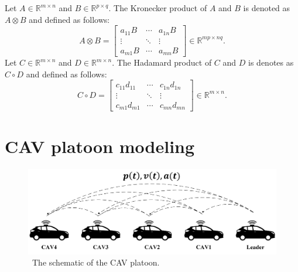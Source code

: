 \documentclass[a4paper]{cas-sc}
\begin{document}
\begin{itemize}
Let $A \in {\mathbb{R}^{m \times n}}$ and $B \in {\mathbb{R}^{p \times q}}$. The Kronecker product of $A$ and $B$ is denoted as $A \otimes B$ and defined as follows:
\begin{equation*}
A \otimes B = \left[ {\begin{array}{*{20}{c}}
  {{a_{11}}B} & \cdots & {{a_{1n}}B} \\
  \vdots      & \ddots & \vdots      \\
  {{a_{m1}}B} & \cdots & {{a_{mn}}B}
\end{array}} \right] \in {\mathbb{R}^{mp \times nq}}.
\end{equation*}
Let $C \in {\mathbb{R}^{m \times n}}$ and $D \in {\mathbb{R}^{m \times n}}$. The Hadamard product of $C$ and $D$ is denotes as $C \circ D$ and defined as follows:
\begin{equation*}
C \circ D = \left[ {\begin{array}{*{20}{c}}
  {{c_{11}}{d_{11}}} & \cdots & {{c_{1n}}{d_{1n}}} \\
  \vdots             & \ddots & \vdots             \\
  {{c_{m1}}{d_{m1}}} & \cdots & {{c_{mn}}{d_{mn}}}
\end{array}} \right] \in {\mathbb{R}^{m \times n}}.
\end{equation*}
\end{itemize}





\section{CAV platoon modeling}
\label{Section 3}

\begin{figure}
  \centering
  \includegraphics[width=14cm]{figs/fig1.png}
  \caption{~The schematic of the CAV platoon.}
  \label{fig1}
\end{figure}
\end{document}

